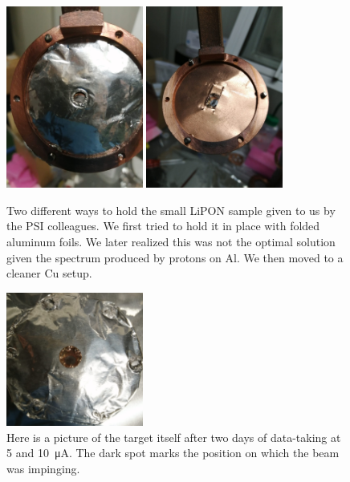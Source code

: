 \begin{refsection}
    \begin{figure}
        \centering
        \includegraphics[width = 0.4\textwidth]{Figures/X17/Dec2023/X17_Dec2023_AlTarget.jpeg}
        \includegraphics[width = 0.4\textwidth]{Figures/X17/Dec2023/X17_Dec2023_CuTarget.jpeg}
        \caption[Small LiPON target setup]{Two different ways to hold the small LiPON sample given to us by the PSI colleagues. We first tried to hold it in place with folded aluminum foils. We later realized this was not the optimal solution given the spectrum produced by protons on Al. We then moved to a cleaner Cu setup.}
        \label{fig:X17:target:LiPON:psi}
    \end{figure}
    \begin{figure}
        \centering

        \includegraphics[width = 0.4\textwidth]{Figures/X17/Dec2023/X17_Dec2023_AlTarget_burned.png}
        \caption[Small LiPON target]{Here is a picture of the target itself after two days of data-taking at 5 and \SI{10}{\micro A}. The dark spot marks the position on which the beam was impinging.}
        \label{fig:X17:target:LiPON:psi}
    \end{figure}       


\end{refsection}

